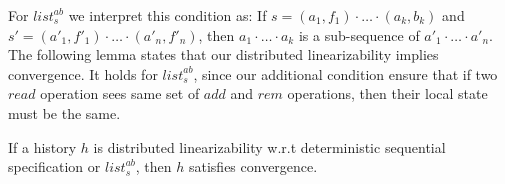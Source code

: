 For $\mathit{list}_s^{\mathit{ab}}$ we interpret this condition as: If $s = (a_1,f_1) \cdot \ldots \cdot (a_k,b_k)$ and $s' = (a'_1,f'_1) \cdot \ldots \cdot (a'_n,f'_n)$, then $a_1 \cdot \ldots \cdot a_k$ is a sub-sequence of $a'_1 \cdot \ldots \cdot a'_n$. The following lemma states that our distributed linearizability implies convergence. It holds for $\mathit{list}_s^{\mathit{ab}}$, since our additional condition ensure that if two $\mathit{read}$ operation sees same set of $\mathit{add}$ and $\mathit{rem}$ operations, then their local state must be the same.

\begin{lemma}
\label{lemma:distributed linarizability implies convergence}
If a history $h$ is distributed linearizability w.r.t deterministic sequential specification or $\mathit{list}_s^{\mathit{ab}}$, then $h$ satisfies convergence.
\end{lemma}




